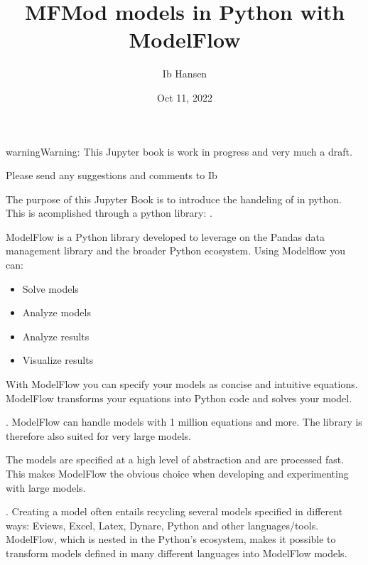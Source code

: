 \documentclass[letterpaper,10pt,english]{jupyterBook}
\title{MFMod models in Python with ModelFlow}
\date{Oct 11, 2022}
\author{Ib Hansen}
\begin{document}
\pagestyle{empty}
\sphinxmaketitle
\pagestyle{plain}
\sphinxtableofcontents
\pagestyle{normal}
\label{\detokenize{content/introduction::doc}}


\begin{sphinxadmonition}{warning}{Warning:}
\sphinxAtStartPar
This Jupyter book is work in progress and very much a draft.

\sphinxAtStartPar
Please send any suggestions and comments to Ib
\end{sphinxadmonition}

\sphinxAtStartPar
The purpose of this Jupyter Book is to introduce
the handeling of  in python. This is acomplished through a python library: .

\sphinxAtStartPar
ModelFlow is a Python library developed to leverage on the Pandas data management library and the broader Python ecosystem. Using Modelflow you can:
\begin{itemize}
\item {} 
\sphinxAtStartPar
Solve models

\item {} 
\sphinxAtStartPar
Analyze models

\item {} 
\sphinxAtStartPar
Analyze results

\item {} 
\sphinxAtStartPar
Visualize results

\end{itemize}

\sphinxAtStartPar
{} With ModelFlow you can specify your models as concise and intuitive equations. ModelFlow transforms your equations into Python code and solves your model.

\sphinxAtStartPar
{}.
ModelFlow can handle models with 1 million equations and more. The library is therefore also suited for very large models.

\sphinxAtStartPar
{}
The models are specified at a high level of abstraction and are processed fast. This makes ModelFlow the obvious choice when developing and experimenting with large models.

\sphinxAtStartPar
{}.
Creating a model often entails recycling several models specified in different ways: Eviews, Excel, Latex, Dynare, Python and other languages/tools.
ModelFlow, which is nested in the Python’s ecosystem, makes it possible to transform models defined in many different languages into ModelFlow models.
\end{document}
